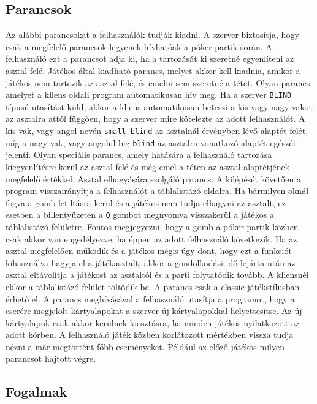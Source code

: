 \subsection{Parancsok}
Az alábbi parancsokat a felhasználók tudják kiadni. A szerver biztosítja, hogy csak a megfelelő parancsok legyenek hívhatóak a póker partik során.
A felhasználó ezt a parancsot adja ki, ha a tartozását ki szeretné egyenlíteni az asztal felé.
Játékos által kiadható parancs, melyet akkor kell kiadnia, amikor a játékos nem tartozik az asztal felé, és emelni sem szeretné a tétet.
Olyan parancs, amelyet a kliens oldali program automatikusan hív meg. Ha a szerver \texttt{BLIND} típusú utasítást küld, akkor a kliens automatikusan beteszi a kis vagy nagy vakot az asztalra attól függően, hogy a szerver mire kötelezte az adott felhasználót. A kis vak, vagy angol nevén \texttt{small blind} az asztalnál érvényben lévő alaptét felét, míg a nagy vak, vagy angolul big \texttt{blind} az asztalra vonatkozó alaptét egészét jelenti.
Olyan speciális parancs, amely hatására a felhasználó tartozása kiegyenlítésre kerül az asztal felé és még emel a téten az asztal alaptétjének megfelelő értékkel.
Asztal elhagyására szolgáló parancs. A kilépését követően a program visszairányítja a felhasználót a táblalistázó oldalra. Ha bármilyen oknál fogva a gomb letiltásra kerül és a játékos nem tudja elhagyni az asztalt, ez esetben a billentyűzeten a \texttt{Q} gombot megnyomva visszakerül a játékos a táblalistázó felületre. Fontos megjegyezni, hogy a gomb a póker partik közben csak akkor van engedélyezve, ha éppen az adott felhasználó következik. Ha az asztal megfelelően működik és a játékos mégis úgy dönt, hogy ezt a funkciót kihasználva hagyja el a játékasztalt, akkor a gondolkodási idő lejárta után az asztal eltávolítja a játékost az asztaltól és a parti folytatódik tovább. A kliensnél ekkor a táblalistázó felület töltődik be.
A parancs csak a classic játékstílusban érhető el. A parancs meghívásával a felhasználó utasítja a programot, hogy a cserére megjelölt kártyalapokat a szerver új kártyalapokkal helyettesítse. Az új kártyalapok csak akkor kerülnek kiosztásra, ha minden játékos nyilatkozott az adott körben.
A felhasználó játék közben korlátozott mértékben vissza tudja nézni a már megtörtént főbb eseményeket. Például az előző játékos milyen parancsot hajtott végre.
\subsection{Fogalmak}

